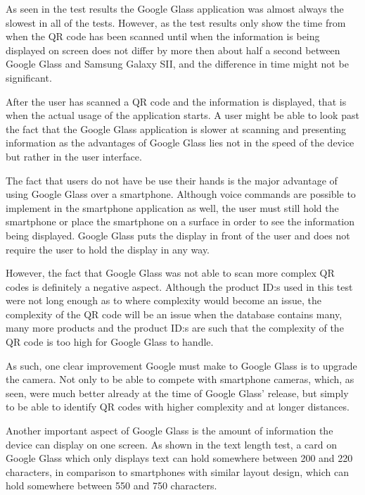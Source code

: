 As seen in the test results the Google Glass application was almost always the slowest in all of the tests. However, as the test results only show the time from when the QR code has been scanned until when the information is being displayed on screen does not differ by more then about half a second between Google Glass and Samsung Galaxy SII, and the difference in time might not be significant. 

After the user has scanned a QR code and the information is displayed, that is when the actual usage of the application starts. A user might be able to look past the fact that the Google Glass application is slower at scanning and presenting information as the advantages of Google Glass lies not in the speed of the device but rather in the user interface.

The fact that users do not have be use their hands is the major advantage of using Google Glass over a smartphone. Although voice commands are possible to implement in the smartphone application as well, the user must still hold the smartphone or place the smartphone on a surface in order to see the information being displayed. Google Glass puts the display in front of the user and does not require the user to hold the display in any way.

However, the fact that Google Glass was not able to scan more complex QR codes is definitely a negative aspect. Although the product ID:s used in this test were not long enough as to where complexity would become an issue, the complexity of the QR code will be an issue when the database contains many, many more products and the product ID:s are such that the complexity of the QR code is too high for Google Glass to handle.

As such, one clear improvement Google must make to Google Glass is to upgrade the camera. Not only to be able to compete with smartphone cameras, which, as seen, were much better already at the time of Google Glass' release, but simply to be able to identify QR codes with higher complexity and at longer distances.

Another important aspect of Google Glass is the amount of information the device can display on one screen. As shown in the text length test, a card on Google Glass which only displays text can hold somewhere between 200 and 220 characters, in comparison to smartphones with similar layout design, which can hold somewhere between 550 and 750 characters.

